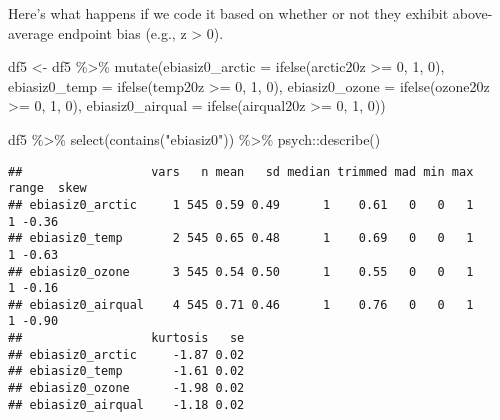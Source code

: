 \documentclass[
]{article}
\newenvironment{Shaded}{\begin{snugshade}}{\end{snugshade}}
\newcommand{\AttributeTok}[1]{\textcolor[rgb]{0.77,0.63,0.00}{#1}}
\newcommand{\DecValTok}[1]{\textcolor[rgb]{0.00,0.00,0.81}{#1}}
\newcommand{\FunctionTok}[1]{\textcolor[rgb]{0.00,0.00,0.00}{#1}}
\newcommand{\NormalTok}[1]{#1}
\newcommand{\OtherTok}[1]{\textcolor[rgb]{0.56,0.35,0.01}{#1}}
\newcommand{\SpecialCharTok}[1]{\textcolor[rgb]{0.00,0.00,0.00}{#1}}
\newcommand{\StringTok}[1]{\textcolor[rgb]{0.31,0.60,0.02}{#1}}
\begin{document}
Here's what happens if we code it based on whether or not they exhibit
above-average endpoint bias (e.g., z \textgreater{} 0).

\begin{Shaded}
\begin{Highlighting}[]
\NormalTok{df5 }\OtherTok{\textless{}{-}}\NormalTok{ df5 }\SpecialCharTok{\%\textgreater{}\%} 
  \FunctionTok{mutate}\NormalTok{(}\AttributeTok{ebiasiz0\_arctic =} \FunctionTok{ifelse}\NormalTok{(arctic20z }\SpecialCharTok{\textgreater{}=} \DecValTok{0}\NormalTok{, }\DecValTok{1}\NormalTok{, }\DecValTok{0}\NormalTok{),}
         \AttributeTok{ebiasiz0\_temp =} \FunctionTok{ifelse}\NormalTok{(temp20z }\SpecialCharTok{\textgreater{}=} \DecValTok{0}\NormalTok{, }\DecValTok{1}\NormalTok{, }\DecValTok{0}\NormalTok{),}
         \AttributeTok{ebiasiz0\_ozone =} \FunctionTok{ifelse}\NormalTok{(ozone20z }\SpecialCharTok{\textgreater{}=} \DecValTok{0}\NormalTok{, }\DecValTok{1}\NormalTok{, }\DecValTok{0}\NormalTok{),}
         \AttributeTok{ebiasiz0\_airqual =} \FunctionTok{ifelse}\NormalTok{(airqual20z }\SpecialCharTok{\textgreater{}=} \DecValTok{0}\NormalTok{, }\DecValTok{1}\NormalTok{, }\DecValTok{0}\NormalTok{))}

\NormalTok{df5 }\SpecialCharTok{\%\textgreater{}\%} 
  \FunctionTok{select}\NormalTok{(}\FunctionTok{contains}\NormalTok{(}\StringTok{"ebiasiz0"}\NormalTok{)) }\SpecialCharTok{\%\textgreater{}\%} 
\NormalTok{  psych}\SpecialCharTok{::}\FunctionTok{describe}\NormalTok{()}
\end{Highlighting}
\end{Shaded}

\begin{verbatim}
##                  vars   n mean   sd median trimmed mad min max range  skew
## ebiasiz0_arctic     1 545 0.59 0.49      1    0.61   0   0   1     1 -0.36
## ebiasiz0_temp       2 545 0.65 0.48      1    0.69   0   0   1     1 -0.63
## ebiasiz0_ozone      3 545 0.54 0.50      1    0.55   0   0   1     1 -0.16
## ebiasiz0_airqual    4 545 0.71 0.46      1    0.76   0   0   1     1 -0.90
##                  kurtosis   se
## ebiasiz0_arctic     -1.87 0.02
## ebiasiz0_temp       -1.61 0.02
## ebiasiz0_ozone      -1.98 0.02
## ebiasiz0_airqual    -1.18 0.02
\end{verbatim}
\end{document}
